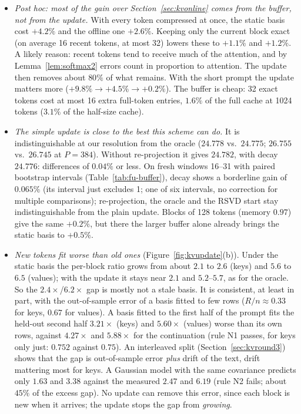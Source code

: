 \documentclass[10pt]{article}
\theoremstyle{plain}
\theoremstyle{definition}
\theoremstyle{remark}
\newcommand{\rl}[1]{\textsf{#1}}%
\begin{document}
\begin{itemize}[leftmargin=2em,itemsep=1pt]
\item \emph{Post hoc: most of the gain over Section~\ref{sec:kvonline} comes from the buffer, not from the update.} With every token compressed at once, the static basis cost $+4.2\%$ and the offline one $+2.6\%$. Keeping only the current block exact (on average 16 recent tokens, at most 32) lowers these to $+1.1\%$ and $+1.2\%$. A likely reason: recent tokens tend to receive much of the attention, and by Lemma~\ref{lem:softmax2} errors count in proportion to attention. The update then removes about $80\%$ of what remains. With the short prompt the update matters more ($+9.8\%\to+4.5\%\to+0.2\%$). The buffer is cheap: 32 exact tokens cost at most 16 extra full-token entries, $1.6\%$ of the full cache at 1024 tokens ($3.1\%$ of the half-size cache).
\item \emph{The simple update is close to the best this scheme can do.} It is indistinguishable at our resolution from the oracle ($24.778$ vs.\ $24.775$; $26.755$ vs.\ $26.745$ at $P=384$). Without re-projection it gives $24.782$, with decay $24.776$: differences of $0.04\%$ or less. On fresh windows 16--31 with paired bootstrap intervals (Table~\ref{tab:fu-buffer}), decay shows a borderline gain of $0.065\%$ (its interval just excludes 1; one of six intervals, no correction for multiple comparisons); re-projection, the oracle and the RSVD start stay indistinguishable from the plain update. Blocks of 128 tokens (memory $0.97$) give the same $+0.2\%$, but there the larger buffer alone already brings the static basis to $+0.5\%$.
\item \emph{New tokens fit worse than old ones} (Figure~\ref{fig:kvupdate}(b)). Under the static basis the per-block ratio grows from about $2.1$ to $2.6$ (keys) and $5.6$ to $6.5$ (values); with the update it stays near $2.1$ and $5.2$--$5.7$, as for the oracle. So the $2.4\times$/$6.2\times$ gap is mostly not a stale basis. It is consistent, at least in part, with the out-of-sample error of a basis fitted to few rows ($R/n\approx0.33$ for keys, $0.67$ for values). A basis fitted to the first half of the prompt fits the held-out second half $3.21\times$ (keys) and $5.60\times$ (values) worse than its own rows, against $4.27\times$ and $5.88\times$ for the continuation (rule \rl{N1} passes, for keys only just: $0.752$ against $0.75$). An interleaved split (Section~\ref{sec:kvround3}) shows that the gap is out-of-sample error \emph{plus} drift of the text, drift mattering most for keys. A Gaussian model with the same covariance predicts only $1.63$ and $3.38$ against the measured $2.47$ and $6.19$ (rule \rl{N2} fails; about $45\%$ of the excess gap). No update can remove this error, since each block is new when it arrives; the update stops the gap from \emph{growing}.

\end{itemize}
\end{document}
